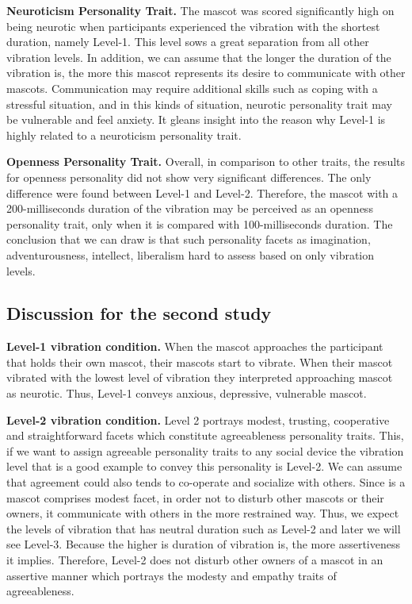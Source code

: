 \par \textbf{Neuroticism Personality Trait.}
The mascot was scored significantly high on being neurotic when participants experienced
the vibration with the shortest duration, namely Level-1.
This level sows a great separation from all other vibration levels.
In addition, we can assume that the longer the duration of the vibration is,
the more this mascot represents its desire to communicate with other mascots.
Communication may require additional skills such as coping with a stressful situation,
and in this kinds of situation, neurotic personality trait may be vulnerable and feel anxiety.
It gleans insight into the reason why Level-1 is highly related to a neuroticism personality trait.

\par\textbf{Openness Personality Trait.}
Overall, in comparison to other traits, the results for openness personality did not show very significant differences.
The only difference were found between Level-1 and Level-2.
Therefore, the mascot with a 200-milliseconds duration of the vibration
may be perceived as an openness personality trait, only when it is compared with 100-milliseconds duration.
The conclusion that we can draw is that such personality facets as imagination, adventurousness,
intellect, liberalism hard to assess based on only vibration levels.

\subsection{Discussion for the second study}
\label{subsec:discussion-for-the-second-study3}

\par\textbf{Level-1 vibration condition.}
When the mascot approaches the participant that holds their own mascot, their mascots start to vibrate.
When their mascot vibrated with the lowest level of vibration they interpreted approaching mascot as neurotic.
Thus, Level-1 conveys anxious, depressive, vulnerable mascot.

\par\textbf{Level-2 vibration condition.}
Level 2 portrays modest, trusting, cooperative and straightforward facets which constitute
agreeableness personality traits.
This, if we want to assign agreeable personality traits to any social device the vibration
level that is a good example to convey this personality is Level-2.
We can assume that agreement could also tends to co-operate and socialize with others.
Since is a mascot comprises modest facet, in order not to disturb other mascots or their owners,
it communicate with others in the more restrained way.
Thus, we expect the levels of vibration that has neutral duration such as Level-2 and later we will see Level-3.
Because the higher is duration of vibration is, the more assertiveness it implies.
Therefore, Level-2 does not disturb other owners of a mascot in an assertive manner
which portrays the modesty and empathy traits of agreeableness.

